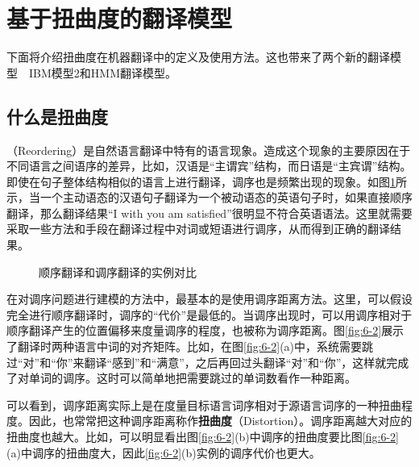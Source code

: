 \section{基于扭曲度的翻译模型}

下面将介绍扭曲度在机器翻译中的定义及使用方法。这也带来了两个新的翻译模型\ \dash\ IBM模型2和HMM翻译模型。

\subsection{什么是扭曲度}

（Reordering）是自然语言翻译中特有的语言现象。造成这个现象的主要原因在于不同语言之间语序的差异，比如，汉语是“主谓宾”结构，而日语是“主宾谓”结构。即使在句子整体结构相似的语言上进行翻译，调序也是频繁出现的现象。如图\ref{fig:6-1}所示，当一个主动语态的汉语句子翻译为一个被动语态的英语句子时，如果直接顺序翻译，那么翻译结果“I with you am satisfied”很明显不符合英语语法。这里就需要采取一些方法和手段在翻译过程中对词或短语进行调序，从而得到正确的翻译结果。
\begin{figure}[htp]
    \centering

    \caption{顺序翻译和调序翻译的实例对比}
    \label{fig:6-1}
\end{figure}

\parinterval 在对调序问题进行建模的方法中，最基本的是使用调序距离方法。这里，可以假设完全进行顺序翻译时，调序的“代价”是最低的。当调序出现时，可以用调序相对于顺序翻译产生的位置偏移来度量调序的程度，也被称为调序距离。图\ref{fig:6-2}展示了翻译时两种语言中词的对齐矩阵。比如，在图\ref{fig:6-2}(a)中，系统需要跳过“对”和“你”来翻译“感到”和“满意”，之后再回过头翻译“对”和“你”，这样就完成了对单词的调序。这时可以简单地把需要跳过的单词数看作一种距离。

\parinterval 可以看到，调序距离实际上是在度量目标语言词序相对于源语言词序的一种扭曲程度。因此，也常常把这种调序距离称作{\small\sffamily\bfseries{扭曲度}}（Distortion）。调序距离越大对应的扭曲度也越大。比如，可以明显看出图\ref{fig:6-2}(b)中调序的扭曲度要比图\ref{fig:6-2}(a)中调序的扭曲度大，因此\ref{fig:6-2}(b)实例的调序代价也更大。

